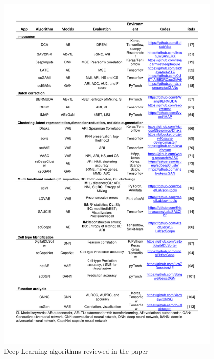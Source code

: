 \documentclass[
]{book}
\begin{document}
\begin{figure}

{\centering \includegraphics[width=23.61in]{Table/Table1} 

}

\caption{Deep Learning algorithms reviewed in the paper}\label{fig:Table1}
\end{figure}
\end{document}
